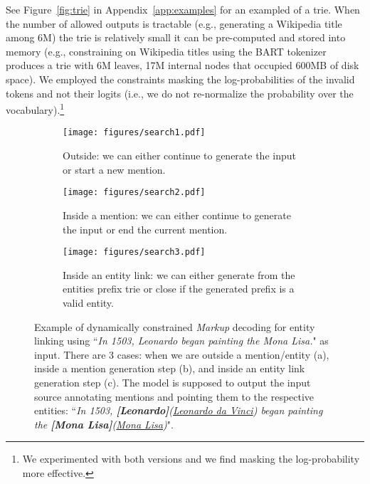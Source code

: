 \documentclass{article} \usepackage{main,times}
\begin{document}
See Figure~\ref{fig:trie} in Appendix~\ref{app:examples} for an exampled of a trie.
When the number of allowed outputs is tractable (e.g., generating a Wikipedia title among 6M) the trie is relatively small it can be pre-computed and stored into memory (e.g., constraining on Wikipedia titles using the BART tokenizer produces a trie with 6M leaves, 17M internal nodes that occupied 600MB of disk space).
We employed the constraints masking the log-probabilities of the invalid tokens and not their logits (i.e., we do not re-normalize the probability over the vocabulary).\footnote{We experimented with both versions and we find masking the log-probability more effective.}


\begin{figure}[t]
     \centering
     \begin{subfigure}[t]{0.25\textwidth}
         \centering
         \texttt{[image: figures/search1.pdf]}
         \caption{Outside: we can either continue to generate the input or start a new mention.}
         \label{fig:mardown_out}
     \end{subfigure}
     \hfill
     \begin{subfigure}[t]{0.31\textwidth}
         \centering
         \texttt{[image: figures/search2.pdf]}
         \caption{Inside a mention: we can either continue to generate the input or end the current mention.}
         \label{fig:mardown_men}
     \end{subfigure}
     \hfill
     \begin{subfigure}[t]{0.4\textwidth}
         \centering
         \texttt{[image: figures/search3.pdf]}
         \caption{Inside an entity link: we can either generate from the entities prefix trie or close if the generated prefix is a valid entity.}
         \label{fig:mardown_ent}
     \end{subfigure}
        \caption{Example of dynamically constrained \textit{Markup} decoding for entity linking using ``\textit{In 1503, Leonardo began painting the Mona Lisa.}" as input. There are 3 cases: when we are outside a mention/entity (a), inside a mention generation step (b), and inside an entity link generation step (c). The model is supposed to output the input source annotating mentions and pointing them to the respective entities: ``\textit{In 1503, \textbf{[Leonardo]}(\underline{Leonardo da Vinci}) began painting the \textbf{[Mona Lisa]}(\underline{Mona Lisa})}".}
        \label{fig:mardown}
\end{figure} 
\end{document}
